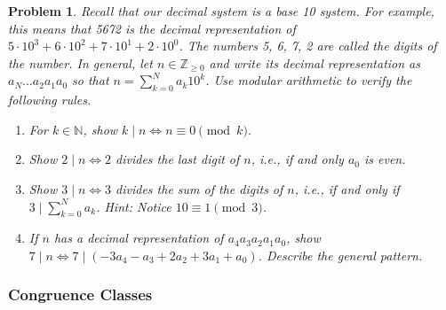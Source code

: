 \documentclass[12pt]{article}
\newtheorem{problem}{Problem}
\numberwithin{problem}{section} %
\theoremstyle{remark}  %
\begin{document}
    \begin{problem}
        Recall that our decimal system is a base 10 system. For example, this means that 5672 is the decimal representation of $5 \cdot 10^3 + 6 \cdot 10^2 + 7 \cdot 10^1 + 2 \cdot 10^0$. The numbers 5, 6, 7, 2 are called the \emph{digits} of the number. In general, let $n\in \mathbb{Z}_{\geq 0}$ and write its decimal representation as $a_N \dots a_2a_1a_0$ so that $n = \sum_{k=0}^{N}a_k 10^k$. Use modular arithmetic to verify the following rules.
        \begin{enumerate}[label=(\alph*)]
            \item For $k\in\mathbb{N}$, show $k \mid n \Leftrightarrow n\equiv 0 \pmod{k}$.
            \item Show $2 \mid n \Leftrightarrow 2$ divides the last digit of $n$, i.e., if and only $a_0$ is even.
            \item Show $3 \mid n \Leftrightarrow 3$ divides the sum of the digits of $n$, i.e., if and only if $3 \mid \sum_{k=0}^{N}a_k$. Hint: Notice $10\equiv1\pmod{3}$.
            \item If $n$ has a decimal representation of $a_4a_3a_2a_1a_0$, show $7 \mid n \Leftrightarrow 7 \mid (-3a_4 - a_3 + 2a_2 + 3a_1 +a_0)$. Describe the general pattern.
        \end{enumerate}
    \end{problem}

\subsubsection{Congruence Classes}
\end{document}

